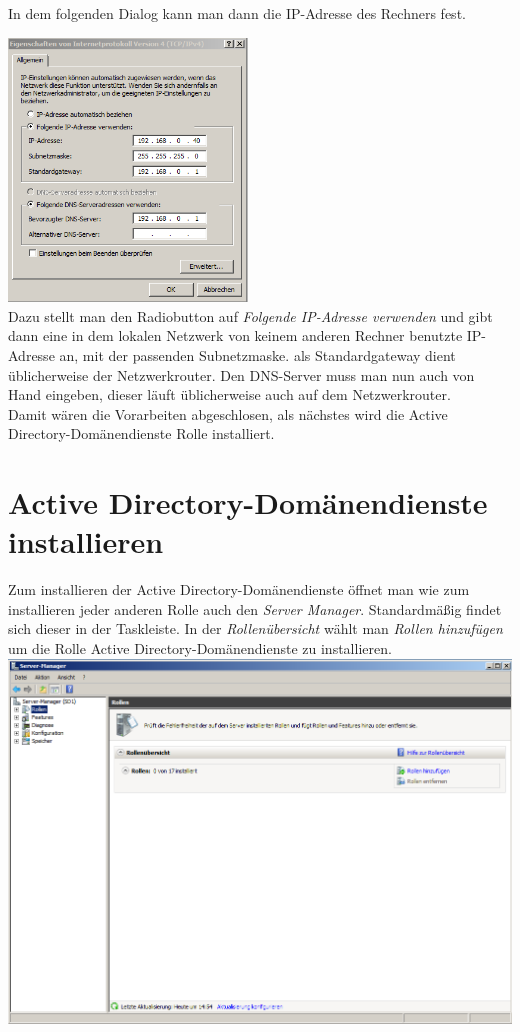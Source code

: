 \documentclass[12pt,a4paper,titlepage]{article} %
\begin{document}
In dem folgenden Dialog kann man dann die IP-Adresse des Rechners fest. 

	\includegraphics[height=7cm]{Bilder/005}\\
	
Dazu stellt man den Radiobutton auf \emph{Folgende IP-Adresse verwenden} und gibt dann eine in dem lokalen Netzwerk von keinem anderen Rechner benutzte IP-Adresse an, mit der passenden Subnetzmaske. als Standardgateway dient üblicherweise der Netzwerkrouter. Den DNS-Server muss man nun auch von Hand eingeben, dieser läuft üblicherweise auch auf dem Netzwerkrouter.\\
Damit wären die Vorarbeiten abgeschlosen, als nächstes wird die Active Directory-Domänendienste Rolle installiert.

\newpage
\section{Active Directory-Domänendienste installieren}
Zum installieren der Active Directory-Domänendienste öffnet man wie zum installieren jeder anderen Rolle auch den \emph{Server Manager}. Standardmäßig findet sich dieser in der Taskleiste. In der \emph{Rollenübersicht} wählt man \emph{Rollen hinzufügen} um die Rolle Active Directory-Domänendienste zu installieren.\\

	\includegraphics[width=14cm]{Bilder/006}\\
	
\end{document}
